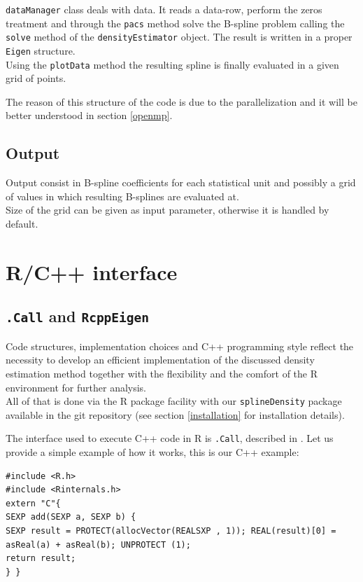 \verb|dataManager| class deals with data. It reads a data-row, perform the zeros treatment and through the \verb|pacs| method solve the B-spline problem calling the \verb|solve| method of the \verb|densityEstimator| object. The result is written in a proper \verb|Eigen| structure. \\ Using the \verb|plotData| method the resulting spline is finally evaluated in a given grid of points.

The reason of this structure of the code is due to the parallelization and it will be better understood in section \ref{openmp}.

\subsection{Output}
Output consist in B-spline coefficients for each statistical unit and possibly a grid of values in which resulting B-splines are evaluated at. \\ Size of the grid can be given as input parameter, otherwise it is handled by default.

\section{R/C++ interface} \label{R}
\subsection{\texttt{.Call} and \texttt{RcppEigen}}
Code structures, implementation choices and C++ programming style reflect the necessity to develop an efficient implementation of the discussed density estimation method together with the flexibility and the comfort of the R environment for further analysis. \\ All of that is done via the R package facility with our \verb|splineDensity| package available in the git repository (see section \ref{installation} for installation details). 

The interface used to execute C++ code in R is \verb|.Call|, described in \cite{manual:rext}. Let us provide a simple example of how it works, this is our C++ example:

\begin{lstlisting}
#include <R.h>
#include <Rinternals.h>
extern "C"{
SEXP add(SEXP a, SEXP b) {
SEXP result = PROTECT(allocVector(REALSXP , 1)); REAL(result)[0] = asReal(a) + asReal(b); UNPROTECT (1);
return result;
} }
\end{lstlisting}

